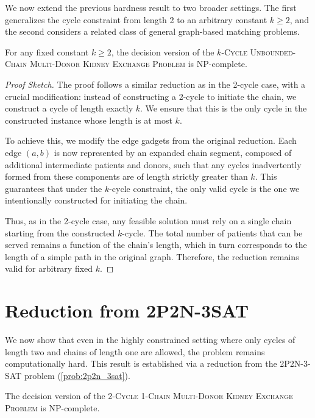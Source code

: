 We now extend the previous hardness result to two broader settings. The first generalizes the cycle constraint from length 2 to an arbitrary constant $k \ge 2$, and the second considers a related class of general graph-based matching problems.

\begin{lemma}
For any fixed constant $k \ge 2$, the decision version of the \textsc{$k$-Cycle Unbounded-Chain Multi-Donor Kidney Exchange Problem} is NP-complete.
\end{lemma}

\begin{proof}[Proof Sketch]
The proof follows a similar reduction as in the 2-cycle case, with a crucial modification: instead of constructing a 2-cycle to initiate the chain, we construct a cycle of length exactly $k$. We ensure that this is the only cycle in the constructed instance whose length is at most $k$.

To achieve this, we modify the edge gadgets from the original reduction. Each edge $(a, b)$ is now represented by an expanded chain segment, composed of additional intermediate patients and donors, such that any cycles inadvertently formed from these components are of length strictly greater than $k$. This guarantees that under the $k$-cycle constraint, the only valid cycle is the one we intentionally constructed for initiating the chain.

Thus, as in the 2-cycle case, any feasible solution must rely on a single chain starting from the constructed $k$-cycle. The total number of patients that can be served remains a function of the chain's length, which in turn corresponds to the length of a simple path in the original graph. Therefore, the reduction remains valid for arbitrary fixed $k$.
\end{proof}



\section{Reduction from 2P2N-3SAT}

We now show that even in the highly constrained setting where only cycles of length two and chains of length one are allowed, the problem remains computationally hard. This result is established via a reduction from the \textsc{2P2N-3-SAT} problem (\autoref{prob:2p2n_3sat}).

\begin{lemma}
The decision version of the \textsc{2-Cycle 1-Chain Multi-Donor Kidney Exchange Problem} is NP-complete.
\end{lemma}

